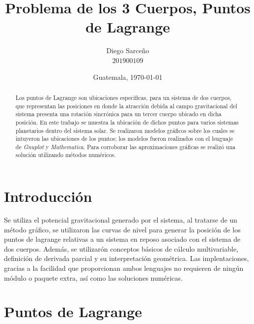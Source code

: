 





\title{\sc Problema de los 3 Cuerpos, Puntos de Lagrange}%
\author{Diego Sarceño \\ $201900109$}
\date{Guatemala, \today}

  
\maketitle

\begin{abstract}
  Los puntos de Lagrange son ubicaciones específicas, para un sistema de dos cuerpos, que representan las posiciones en donde la atracción debida al campo gravitacional del sistema presenta una rotación sincrónica para un tercer cuerpo ubicado en dicha posición. En este trabajo se muestra la ubicación de dichos puntos para varios sistemas planetarios dentro del sistema solar. Se realizaron modelos gráficos sobre los cuales se intuyeron las ubicaciones de los puntos; los modelos fueron realizados con el lenguaje de \textit{Gnuplot} y \textit{Mathematica}. Para corroborar las aproximaciones gráficas se realizó una solución utilizando métodos numéricos.
\end{abstract}


\section{Introducción}
\label{sec:intro}
\justify 
Se utiliza el potencial gravitacional generado por el sistema, al tratarse de un método gráfico, se utilizaron las curvas de nivel para generar la posición de los puntos de lagrange relativas a un sistema en reposo asociado con el sistema de dos cuerpos. Además, se utilizarón conceptos básicos de cálculo multivariable, definición de derivada parcial y su interpretación geométrica. Las implentaciones, gracias a la facilidad que proporcionan ambos lenguajes no requieren de ningún módulo o paquete extra, así como las soluciones numéricas.	


\section{Puntos de Lagrange}
